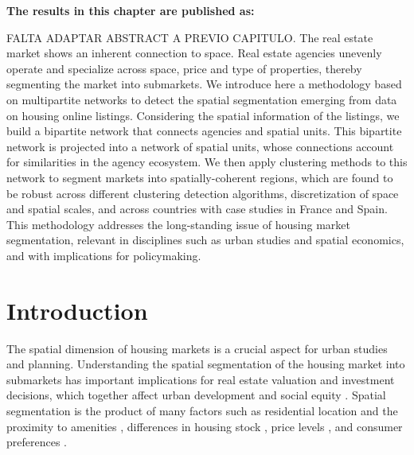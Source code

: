 \vspace{-1.5cm}
\small
\textbf{The results in this chapter are published as:}
\vspace{0.05 cm}

\normalsize
\vspace{0.5 cm}

FALTA ADAPTAR ABSTRACT A PREVIO CAPITULO.
The real estate market shows an inherent connection to space. Real estate agencies unevenly operate and specialize across space, price and type of properties, thereby segmenting the market into submarkets. We introduce here a methodology based on multipartite networks to detect the spatial segmentation emerging from data on housing online listings. Considering the spatial information of the listings, we build a bipartite network that connects agencies and spatial units. This bipartite network is projected into a network of spatial units, whose connections account for similarities in the agency ecosystem. We then apply clustering methods to this network to segment  markets into spatially-coherent regions, which are found to be robust across different clustering detection algorithms, discretization of space and spatial scales, and across countries with case studies in France and Spain.  This methodology addresses the long-standing issue of housing market segmentation, relevant in disciplines such as urban studies and spatial economics, and with implications for policymaking. 

\section{Introduction}
\label{sec:introduction}

The spatial dimension of housing markets is a crucial aspect for urban studies and planning. Understanding the spatial segmentation of the housing market into submarkets \cite{morawakage2022housing,bourassa2003housing} has important implications for real estate valuation and investment decisions, which together affect urban development and social equity \cite{bourassa2003housing}. Spatial segmentation is the product of many factors such as residential location and the proximity to amenities \cite{bourassa2003housing}, differences in housing stock \cite{keskin2017defining}, price levels \cite{goodman1998housing}, and consumer preferences \cite{leishman2013predictive}. 

